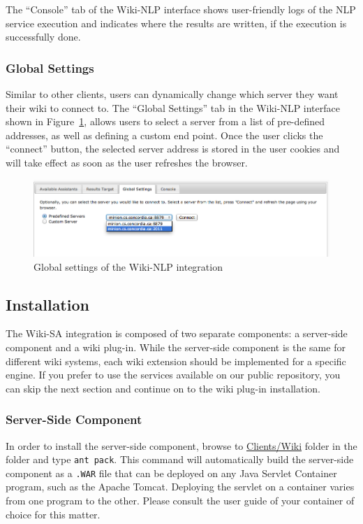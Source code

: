 The ``Console'' tab of the Wiki-NLP interface shows user-friendly logs of the NLP service execution and indicates where the results are written, if the execution is successfully done.

\subsubsection{Global Settings}
Similar to other \sa clients, users can dynamically change which \sa server they want their wiki to connect to. The ``Global Settings'' tab in the Wiki-NLP interface shown in Figure~\ref{fig:semassist_settings}, allows users to select a \sa server from a list of pre-defined addresses, as well as defining a custom end point. Once the user clicks the ``connect'' button, the selected server address is stored in the user cookies and will take effect as soon as the user refreshes the browser.

\begin{figure}[h!]
\centering
\includegraphics[width=\textwidth]{pictures/semassist_settings.png}
\caption{Global settings of the Wiki-NLP integration}
\label{fig:semassist_settings}
\end{figure}

\subsection{Installation}
The Wiki-SA integration is composed of two separate components: a server-side component and a wiki plug-in. While the server-side component is the same for different wiki systems, each wiki extension should be implemented for a specific engine. If you prefer to use the services available on our public repository, you can skip the next section and continue on to the wiki plug-in installation.

\subsubsection{Server-Side Component}
In order to install the server-side component, browse to \url{Clients/Wiki} folder in the \sa folder and type \texttt{ant pack}. This command will automatically build the server-side component as a \texttt{.WAR} file that can be deployed on any Java Servlet Container program, such as the Apache Tomcat. Deploying the servlet on a container varies from one program to the other. Please consult the user guide of your container of choice for this matter.

